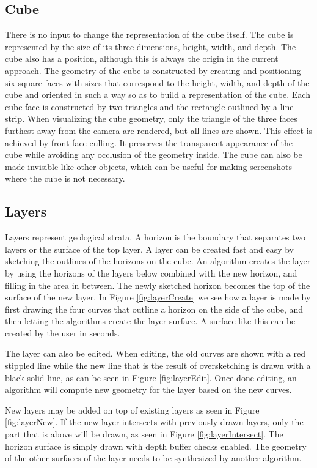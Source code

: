 \documentclass[a4paper,12pt]{report}
\begin{document}
\subsection{Cube}
There is no input to change the representation of the cube itself. The cube is represented by the size of its three dimensions, height, width, and depth. The cube also has a position, although this is always the origin in the current approach. The geometry of the cube is constructed by creating and positioning six square faces with sizes that correspond to the height, width, and depth of the cube and oriented in such a way so as to build a representation of the cube. Each cube face is constructed by two triangles and the rectangle outlined by a line strip. When visualizing the cube geometry, only the triangle of the three faces furthest away from the camera are rendered, but all lines are shown. This effect is achieved by front face culling. It preserves the transparent appearance of the cube while avoiding any occlusion of the geometry inside. The cube can also be made invisible like other objects, which can be useful for making screenshots where the cube is not necessary.

\subsection{Layers}
\label{subsec:layers}
Layers represent geological strata. A horizon is the boundary that separates two layers or the surface of the top layer. A layer can be created fast and easy by sketching the outlines of the horizons on the cube. An algorithm creates the layer by using the horizons of the layers below combined with the new horizon, and filling in the area in between. The newly sketched horizon becomes the top of the surface of the new layer. In Figure \ref{fig:layerCreate} we see how a layer is made by first drawing the four curves that outline a horizon on the side of the cube, and then letting the algorithms create the layer surface. A surface like this can be created by the user in seconds.

The layer can also be edited. When editing, the old curves are shown with a red stippled line while the new line that is the result of oversketching is drawn with a black solid line, as can be seen in Figure \ref{fig:layerEdit}. Once done editing, an algorithm will compute new geometry for the layer based on the new curves.

New layers may be added on top of existing layers as seen in Figure \ref{fig:layerNew}. If the new layer intersects with previously drawn layers, only the part that is above will be drawn, as seen in Figure \ref{fig:layerIntersect}. The horizon surface is simply drawn with depth buffer checks enabled. The geometry of the other surfaces of the layer needs to be synthesized by another algorithm.
\end{document}
